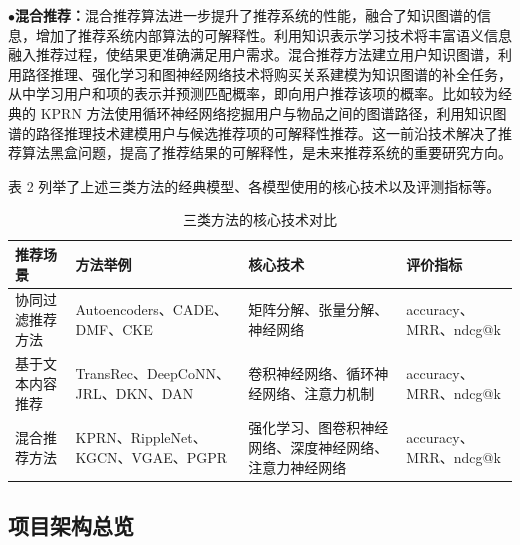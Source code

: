 \documentclass[withoutpreface,bwprint]{cumcmthesis} %
\begin{document}
	$\bullet$\textbf{混合推荐：}混合推荐算法进一步提升了推荐系统的性能，融合了知识图谱的信息，增加了推荐系统内部算法的可解释性。利用知识表示学习技术将丰富语义信息融入推荐过程，使结果更准确满足用户需求。混合推荐方法建立用户知识图谱，利用路径推理、强化学习和图神经网络技术将购买关系建模为知识图谱的补全任务，从中学习用户和项的表示并预测匹配概率，即向用户推荐该项的概率。比如较为经典的 KPRN 方法使用循环神经网络挖掘用户与物品之间的图谱路径，利用知识图谱的路径推理技术建模用户与候选推荐项的可解释性推荐。这一前沿技术解决了推荐算法黑盒问题，提高了推荐结果的可解释性，是未来推荐系统的重要研究方向。\par
	表 2 列举了上述三类方法的经典模型、各模型使用的核心技术以及评测指标等。
	\begin{table}[H]
	\centering
	\caption{三类方法的核心技术对比}
	\begin{tabular}{|m{2cm}|m{4cm}|m{4cm}|m{4cm}|}
		\hline
		推荐场景 & 方法举例 & 核心技术 & 评价指标 \\
		\hline
		协同过滤推荐方法 & Autoencoders、CADE、DMF、CKE & 矩阵分解、张量分解、神经网络 & accuracy、MRR、ndcg@k \\
		\hline
		基于文本内容推荐 & TransRec、DeepCoNN、JRL、DKN、DAN & 卷积神经网络、循环神经网络、注意力机制 & accuracy、MRR、ndcg@k \\
		\hline
		混合推荐方法 & KPRN、RippleNet、KGCN、VGAE、PGPR & 强化学习、图卷积神经网络、深度神经网络、注意力神经网络 & accuracy、MRR、ndcg@k \\
		\hline
	\end{tabular}
	\end{table}
	\subsection{项目架构总览}
\end{document}
